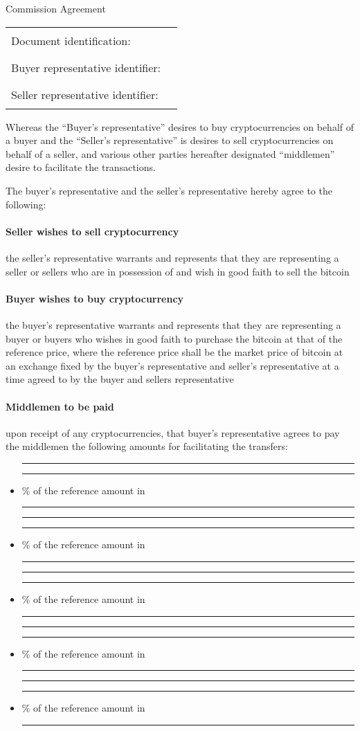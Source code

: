 \documentclass[10pt]{article}
\begin{document}
\begin{center}
{\Large Commission Agreement}
\end{center}
\noindent \begin{tabular}{l l}
Document identification: & \rule{5cm}{.2pt}\\
Buyer representative identifier: & \rule{5cm}{.2pt} \\
Seller representative identifier: & \rule{5cm}{.2pt}
\end{tabular}
\vspace{1cm}

Whereas the “Buyer’s representative” desires to buy
cryptocurrencies on behalf of a buyer and the “Seller’s
representative” is desires to sell cryptocurrencies on behalf of a
seller, and various other parties hereafter designated “middlemen”
desire to facilitate the transactions.

The buyer’s representative and the seller’s representative hereby
agree to the following:

\paragraph{Seller wishes to sell cryptocurrency} the seller’s representative warrants and represents that they are representing a seller or sellers who are in possession of and wish in good faith to sell the bitcoin

\paragraph{Buyer wishes to buy cryptocurrency} the buyer’s representative warrants and represents that they are representing a buyer or buyers who wishes in good faith to purchase the bitcoin at that  of the reference price, where the reference price shall be the market price of bitcoin at an exchange fixed by the buyer’s representative and seller’s representative at a time agreed to by the buyer and sellers representative

\paragraph{Middlemen to be paid} upon receipt of any cryptocurrencies, that buyer’s representative agrees to pay the middlemen the following amounts for facilitating the transfers:
\begin{itemize}
\item \rule{6cm}{.2pt} \rule{1cm}{.2pt} \% of the reference amount
  in \rule{2cm}{.2pt} 
\item \rule{6cm}{.2pt} \rule{1cm}{.2pt} \% of the reference amount
  in \rule{2cm}{.2pt}
\item \rule{6cm}{.2pt} \rule{1cm}{.2pt} \% of the reference amount
  in \rule{2cm}{.2pt}
\item \rule{6cm}{.2pt} \rule{1cm}{.2pt} \% of the reference amount
  in \rule{2cm}{.2pt}
\item \rule{6cm}{.2pt} \rule{1cm}{.2pt} \% of the reference amount
  in \rule{2cm}{.2pt}
\end{itemize}
\end{document}
